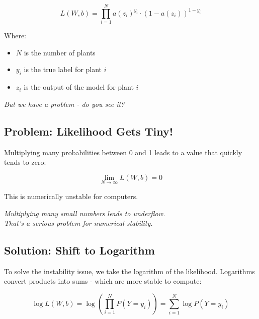 \documentclass[11pt]{article}
\begin{document}
\[
L(W, b) = \prod_{i=1}^{N} a(z_i)^{y_i} \cdot (1 - a(z_i))^{1 - y_i}
\]

Where:
\begin{itemize}
    \item $N$ is the number of plants
    \item $y_i$ is the true label for plant $i$
    \item $z_i$ is the output of the model for plant $i$
\end{itemize}

\vspace{1em}

\begin{tcolorbox}[colback=gray!10, colframe=gray!50!black, boxrule=0.3mm]
\centering
\textit{But we have a problem - do you see it?}
\end{tcolorbox}

\vspace{1.5em}

\subsection*{Problem: Likelihood Gets Tiny!}

Multiplying many probabilities between 0 and 1 leads to a value that quickly tends to zero:

\[
\lim_{N \to \infty} L(W, b) = 0
\]

This is numerically unstable for computers.

\vspace{0.5em}

\begin{tcolorbox}[colback=gray!8, colframe=gray!40!black, sharp corners=southwest, boxrule=0.3mm]
\centering
\textit{Multiplying many small numbers leads to underflow.}\\
\textit{That's a serious problem for numerical stability.}
\end{tcolorbox}


\subsection*{Solution: Shift to Logarithm}

To solve the instability issue, we take the logarithm of the likelihood.  
Logarithms convert products into sums - which are more stable to compute:

\[
\log L(W, b) = \log \left( \prod_{i=1}^{N} P(Y = y_i) \right) = \sum_{i=1}^{N} \log P(Y = y_i)
\]
\end{document}
